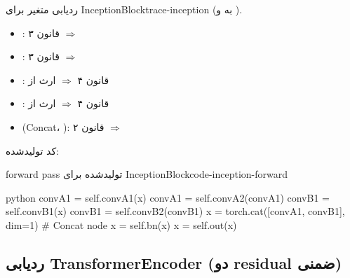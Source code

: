 \documentclass{nngraph-fa}
\begin{document}
\begin{exbox}{ردیابی متغیر برای InceptionBlock}{trace-inception}
 (به  و ).

\begin{itemize}
    \item {}: قانون ۳ $\Rightarrow$ 
    \item {}: قانون ۳ $\Rightarrow$ 
    \item {}: قانون ۴ $\Rightarrow$ ارث از 
    \item {}: قانون ۴ $\Rightarrow$ ارث از 
    \item {} (Concat، ): قانون ۲ $\Rightarrow$ 
\end{itemize}

کد تولیدشده:
\begin{codebox}{forward pass تولیدشده برای InceptionBlock}{code-inception-forward}
\begin{amzcode}{python}
convA1 = self.convA1(x)
convA1 = self.convA2(convA1)
convB1 = self.convB1(x)
convB1 = self.convB2(convB1)
x      = torch.cat([convA1, convB1], dim=1)  # Concat node
x      = self.bn(x)
x      = self.out(x)
\end{amzcode}
\end{codebox}
\end{exbox}

\subsection{ردیابی TransformerEncoder (دو residual ضمنی)}
\end{document}
